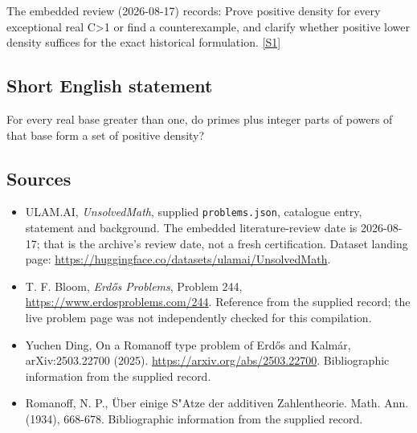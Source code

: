 \documentclass[11pt,a4paper]{article}
\newcommand{\sref}[2]{\hyperlink{source:#1:#2}{[S#2]}}
\begin{document}
The embedded review (2026-08-17) records: Prove positive density for every exceptional real C>1 or find a counterexample, and clarify whether positive lower density suffices for the exact historical formulation. \sref{statement}{1}

\subsection{Short English statement}

For every real base greater than one, do primes plus integer parts of powers of that base form a set of positive density?

\subsection{Sources}

{\small

\begin{itemize}

\item[\hypertarget{source:statement:1}{S1}] ULAM.AI, \emph{UnsolvedMath}, supplied \texttt{problems.json}, catalogue entry, statement and background. The embedded literature-review date is 2026-08-17; that is the archive’s review date, not a fresh certification. Dataset landing page: \url{https://huggingface.co/datasets/ulamai/UnsolvedMath}.

\item[\hypertarget{source:statement:2}{S2}] T. F. Bloom, \emph{Erdős Problems}, Problem 244, \url{https://www.erdosproblems.com/244}. Reference from the supplied record; the live problem page was not independently checked for this compilation.

\item[\hypertarget{source:statement:3}{S3}] Yuchen Ding, On a Romanoff type problem of Erdős and Kalmár, arXiv:2503.22700 (2025). \url{https://arxiv.org/abs/2503.22700}. Bibliographic information from the supplied record.

\item[\hypertarget{source:statement:4}{S4}] Romanoff, N. P., \"{U}ber einige S"Atze der additiven Zahlentheorie. Math. Ann. (1934), 668-678. Bibliographic information from the supplied record.

\end{itemize}

}

\label{end:statement}
\end{document}
